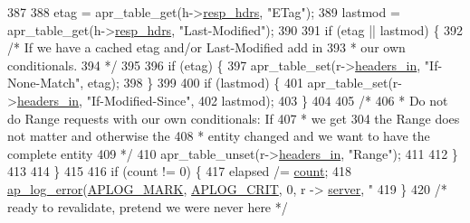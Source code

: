 \begin{DoxyCode}
{387 
388                     etag = apr\_table\_get(h->\hyperlink{structcache__handle_a66c4c1875bb9740d34ddda4d3e71065e}{resp\_hdrs}, \textcolor{stringliteral}{"ETag"});
389                     lastmod = apr\_table\_get(h->\hyperlink{structcache__handle_a66c4c1875bb9740d34ddda4d3e71065e}{resp\_hdrs}, \textcolor{stringliteral}{"Last-Modified"});
390 
391                     \textcolor{keywordflow}{if} (etag || lastmod) \{
392                         \textcolor{comment}{/* If we have a cached etag and/or Last-Modified add in}
393 \textcolor{comment}{                         * our own conditionals.}
394 \textcolor{comment}{                         */}
395 
396                         \textcolor{keywordflow}{if} (etag) \{
397                             apr\_table\_set(r->\hyperlink{structrequest__rec_a5497da6c01af49acf70a4a9b975c1c83}{headers\_in}, \textcolor{stringliteral}{"If-None-Match"}, etag);
398                         \}
399 
400                         \textcolor{keywordflow}{if} (lastmod) \{
401                             apr\_table\_set(r->\hyperlink{structrequest__rec_a5497da6c01af49acf70a4a9b975c1c83}{headers\_in}, \textcolor{stringliteral}{"If-Modified-Since"},
402                                     lastmod);
403                         \}
404 
405                         \textcolor{comment}{/*}
406 \textcolor{comment}{                         * Do not do Range requests with our own conditionals: If}
407 \textcolor{comment}{                         * we get 304 the Range does not matter and otherwise the}
408 \textcolor{comment}{                         * entity changed and we want to have the complete entity}
409 \textcolor{comment}{                         */}
410                         apr\_table\_unset(r->\hyperlink{structrequest__rec_a5497da6c01af49acf70a4a9b975c1c83}{headers\_in}, \textcolor{stringliteral}{"Range"});
411 
412                     \}
413 
414                 \}
415         
416             \textcolor{keywordflow}{if} (count != 0) \{
417             elapsed /= \hyperlink{group__APR__MD5_ga16ff2d8e15ade4948398b0aeb80124a8}{count};
418             \hyperlink{group__APACHE__CORE__LOG_ga5e6676c87418af7a1d323a116c78ecb4}{ap\_log\_error}(\hyperlink{group__APACHE__CORE__LOG_ga655e126996849bcb82e4e5a14c616f4a}{APLOG\_MARK}, \hyperlink{group__APACHE__CORE__LOG_ga9f0686ea770c44e205d1c12be74fc21f}{APLOG\_CRIT}, 0, r -> 
      \hyperlink{group__APACHE__CORE__MUTEX_ga32727ee32089d3426d1d6a7280d28228}{server}, \textcolor{stringliteral}{"%
419          \}
420                 \textcolor{comment}{/* ready to revalidate, pretend we were never here */}
}}
\end{DoxyCode}
